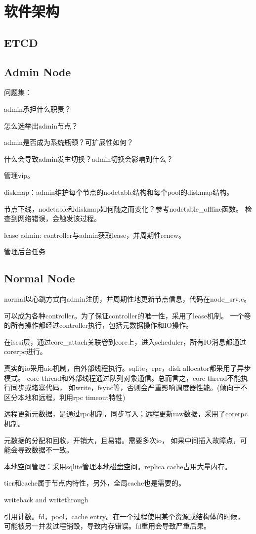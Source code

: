 \chapter{软件架构}

\section{ETCD}

\section{Admin Node}

问题集：
\begin{compactenum}
\item admin承担什么职责？
\item 怎么选举出admin节点？
\item admin是否成为系统瓶颈？可扩展性如何？
\item 什么会导致admin发生切换？admin切换会影响到什么？
\end{compactenum}

管理vip。

diskmap：admin维护每个节点的nodetable结构和每个pool的diskmap结构。

节点下线，nodetable和diskmap如何随之而变化？参考nodetable\_offline函数。
检查到网络错误，会触发该过程。

lease admin: controller与admin获取lease，并周期性renew。

管理后台任务

\section{Normal Node}

normal以心跳方式向admin注册，并周期性地更新节点信息，代码在node\_srv.c。

可以成为各种controller。为了保证controller的唯一性，采用了lease机制。
一个卷的所有操作都经过controller执行，包括元数据操作和IO操作。

在iscsi层，通过core\_attach关联卷到core上，进入scheduler，所有IO消息都通过corerpc进行。

真实的io采用aio机制，由外部线程执行。sqlite，rpc，disk allocator都采用了异步模式。
core thread和外部线程通过队列对象通信。总而言之，core thread不能执行同步或堵塞代码，
如write，fsync等，否则会严重影响调度器性能。(倾向于不区分本地和远程，利用rpc timeout特性)

远程更新元数据，是通过rpc机制，同步写入；远程更新raw数据，采用了corerpc机制。

元数据的分配和回收，开销大，且易错。需要多次io，
如果中间插入故障点，可能会导致数据不一致。

本地空间管理：采用sqlite管理本地磁盘空间。replica cache占用大量内存。

tier和cache属于节点内特性，另外，全局cache也是需要的。

writeback and writethrough

引用计数。fd，pool，cache entry。在一个过程使用某个资源或结构体的时候，
可能被另一并发过程销毁，导致内存错误。fd重用会导致严重后果。
